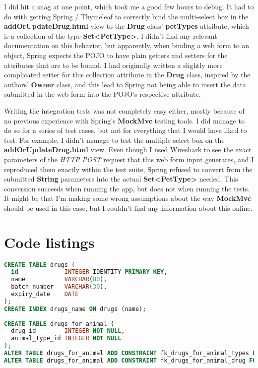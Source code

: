 \documentclass[12pt, a4paper]{article}
\begin{document}
I did hit a snag at one point, which took me a good few hours to debug. It had to do with getting Spring / Thymeleaf to correctly bind the multi-select box in the \textbf{addOrUpdateDrug.html} view to the \textbf{Drug} class' \textbf{petTypes} attribute, which is a collection of the type \textbf{Set\textless PetType\textgreater}. I didn't find any relevant documentation on this behavior, but apparently, when binding a web form to an object, Spring expects the POJO to have plain getters and setters for the attributes that are to be bound. I had originally written a slightly more complicated setter for this collection attribute in the \textbf{Drug} class, inspired by the authors' \textbf{Owner} class, and this lead to Spring not being able to insert the data submitted in the web form into the POJO's respective attribute.

Writing the integration tests was not completely easy either, mostly because of no previous experience with Spring's \textbf{MockMvc} testing tools. I did manage to do so for a series of test cases, but not for everything that I would have liked to test. For example, I didn't manage to test the multiple select box on the \textbf{addOrUpdateDrug.html} view. Even though I used Wireshark to see the exact parameters of the \textit{HTTP POST} request that this web form input generates, and I reproduced them exactly within the test suite, Spring refused to convert from the submitted \textbf{String} parameters into the actual \textbf{Set\textless PetType\textgreater} needed. This conversion succeeds when running the app, but does not when running the tests. It might be that I'm making some wrong assumptions about the way \textbf{MockMvc} should be used in this case, but I couldn't find any information about this online.

\newpage
\section{Code listings}

\begin{lstlisting}[language=SQL, title='schema.sql']
CREATE TABLE drugs (
  id             INTEGER IDENTITY PRIMARY KEY,
  name           VARCHAR(80),
  batch_number   VARCHAR(30),
  expiry_date    DATE
);
CREATE INDEX drugs_name ON drugs (name);
 
CREATE TABLE drugs_for_animal (
  drug_id        INTEGER NOT NULL,
  animal_type_id INTEGER NOT NULL
);
ALTER TABLE drugs_for_animal ADD CONSTRAINT fk_drugs_for_animal_types FOREIGN KEY (animal_type_id) REFERENCES types (id);
ALTER TABLE drugs_for_animal ADD CONSTRAINT fk_drugs_for_animal_drug FOREIGN KEY (drug_id) REFERENCES drugs (id);
\end{lstlisting}
\end{document}
